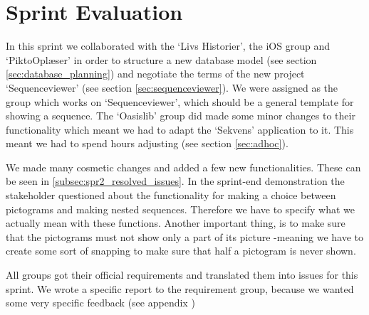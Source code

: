 \section{Sprint Evaluation}\label{sec:spr2_spreval}
In this sprint we collaborated with the `Livs Historier', the iOS group and `PiktoOplæser' in order to structure a new database model (see section \ref{sec:database_planning}) and negotiate the terms of the new project `Sequenceviewer' (see section \ref{sec:sequenceviewer}).
We were assigned as the group which works on `Sequenceviewer', which should be a general template for showing a sequence.
The `Oasislib' group did made some minor changes to their functionality which meant we had to adapt the `Sekvens' application to it. This meant we had to spend hours adjusting (see section \ref{sec:adhoc}).


We made many cosmetic changes and added a few new functionalities. These can be seen in \ref{subsec:spr2_resolved_issues}.
In the sprint-end demonstration the stakeholder questioned about the functionality for making a choice between pictograms and making nested sequences.
Therefore we have to specify what we actually mean with these functions.
Another important thing, is to make sure that the pictograms must not show only a part of its picture -meaning we have to create some sort of snapping to make sure that half a pictogram is never shown.


All groups got their official requirements and translated them into issues for this sprint. We wrote a specific report to the requirement group, because we wanted some very specific feedback (see appendix )